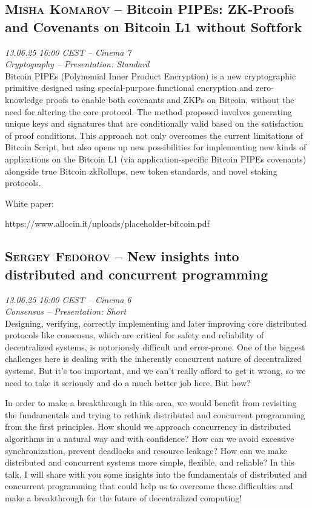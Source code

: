 \clearpage
\subsection {\textsc{Misha Komarov}  -- Bitcoin PIPEs: ZK-Proofs and Covenants on Bitcoin L1 without Softfork} \noindent \textit {13.06.25 16:00 CEST -- Cinema 7\\ Cryptography -- Presentation: Standard}\\[1em] Bitcoin PIPEs (Polynomial Inner Product Encryption) is a new cryptographic primitive designed using special-purpose functional encryption and zero-knowledge proofs to enable both covenants and ZKPs on Bitcoin, without the need for altering the core protocol. The method proposed involves generating unique keys and signatures that are conditionally valid based on the satisfaction of proof conditions. This approach not only overcomes the current limitations of Bitcoin Script, but also opens up new possibilities for implementing new kinds of applications on the Bitcoin L1 (via application-specific Bitcoin PIPEs covenants) alongside true Bitcoin zkRollups, new token standards, and novel staking protocols.

White paper:

https://www.allocin.it/uploads/placeholder-bitcoin.pdf

\clearpage
\subsection {\textsc{Sergey Fedorov}  -- New insights into distributed and concurrent programming} \noindent \textit {13.06.25 16:00 CEST -- Cinema 6\\ Consensus -- Presentation: Short}\\[1em] Designing, verifying, correctly implementing and later improving core distributed protocols like consensus, which are critical for safety and reliability of decentralized systems, is notoriously difficult and error-prone. One of the biggest challenges here is dealing with the inherently concurrent nature of decentralized systems. But it’s too important, and we can’t really afford to get it wrong, so we need to take it seriously and do a much better job here. But how?

In order to make a breakthrough in this area, we would benefit from revisiting the fundamentals and trying to rethink distributed and concurrent programming from the first principles. How should we approach concurrency in distributed algorithms in a natural way and with confidence? How can we avoid excessive synchronization, prevent deadlocks and resource leakage? How can we make distributed and concurrent systems more simple, flexible, and reliable? In this talk, I will share with you some insights into the fundamentals of distributed and concurrent programming that could help us to overcome these difficulties and make a breakthrough for the future of decentralized computing!

